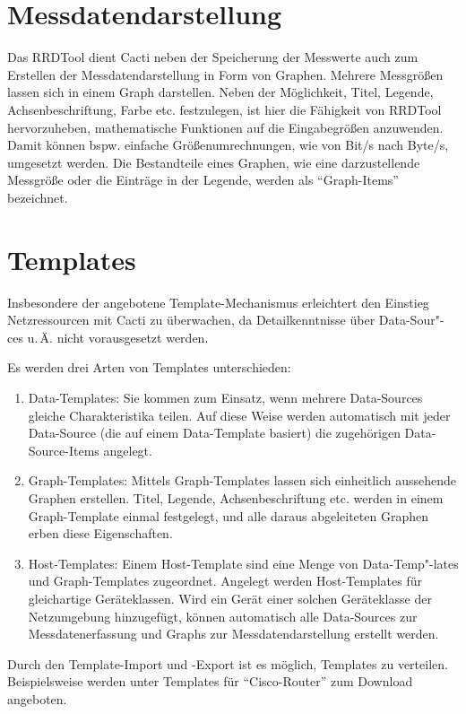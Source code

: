 \documentclass[12pt,ngerman,toc=listofnumbered,toc=bibliographynumbered,toc=index,headsepline=true]{scrbook}
\begin{document}
\section{Messdatendarstellung}
Das RRDTool dient Cacti neben der Speicherung der Messwerte auch zum Erstellen
der Messdatendarstellung in Form von Graphen. Mehrere Messgrößen lassen sich in
einem Graph darstellen. Neben der Möglichkeit, Titel, Legende,
Achsenbeschriftung, Farbe etc. festzulegen, ist hier die Fähigkeit von RRDTool
hervorzuheben, mathematische Funktionen auf die Eingabegrößen anzuwenden. Damit
können bspw. einfache Größenumrechnungen, wie von Bit/s nach Byte/s, umgesetzt
werden. Die Bestandteile eines Graphen, wie eine darzustellende Messgröße oder
die Einträge in der Legende, werden als \enquote{Graph-Items} bezeichnet.

\section{Templates}
Insbesondere der angebotene Template-Mechanismus erleichtert den Einstieg
Netzressourcen mit Cacti zu überwachen, da Detailkenntnisse über Data-Sour"-ces
u.\,Ä. nicht vorausgesetzt werden.

Es werden drei Arten von Templates unterschieden:
\begin{enumerate}
  \item Data-Templates: Sie kommen zum Einsatz, wenn mehrere Data-Sources
  gleiche Charakteristika teilen. Auf diese Weise werden automatisch mit jeder
  Data-Source (die auf einem Data-Template basiert) die zugehörigen
  Data-Source-Items angelegt.
  \item  Graph-Templates: Mittels Graph-Templates lassen sich einheitlich
  aussehende Graphen erstellen. Titel, Legende, Achsenbeschriftung etc. werden
  in einem Graph-Template einmal festgelegt, und alle daraus abgeleiteten
  Graphen erben diese Eigenschaften.
  \item Host-Templates: Einem Host-Template sind eine Menge von Data-Temp"-lates
  und Graph-Templates zugeordnet. Angelegt werden Host-Templates für
  gleichartige Geräteklassen. Wird ein Gerät einer solchen Geräteklasse der
  Netzumgebung hinzugefügt, können automatisch alle Data-Sources zur
  Messdatenerfassung und Graphs zur Messdatendarstellung erstellt werden.
\end{enumerate}
Durch den Template-Import und -Export ist es möglich, Templates zu verteilen.
Beispielsweise werden unter \cite{Cacti11} Templates für \enquote{Cisco-Router}
zum Download angeboten.
\end{document}
